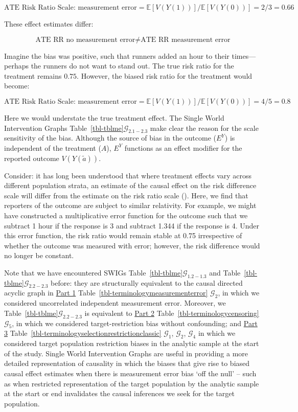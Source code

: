 \documentclass[
  single column]{article}
\begin{document}
\[
\text{ATE Risk Ratio Scale: measurement error} = \mathbb{E}[V(Y(1))] / \mathbb{E}[V(Y(0))] = 2 / 3 = 0.66
\]

These effect estimates differ:

\[\text{ATE RR no measurement error} \neq \text{ATE RR measurement error}\]

Imagine the bias was positive, such that runners added an hour to their
times---perhaps the runners do not want to stand out. The true risk
ratio for the treatment remains \(0.75\). However, the biased risk ratio
for the treatment would become:

\[
\text{ATE Risk Ratio Scale: measurement error} = \mathbb{E}[V(Y(1))] / \mathbb{E}[V(Y(0))] = 4 / 5 = 0.8
\]

Here we would understate the true treatment effect. The Single World
Intervention Graphs Table~\ref{tbl-tblme}\(\mathcal{G}_{2.1-2.3}\) make
clear the reason for the scale sensitivity of the bias. Although the
source of bias in the outcome (\(E^Y\)) is independent of the treatment
(\(A\)), \(E^Y\) functions as an effect modifier for the reported
outcome \(V(Y(\tilde{a}))\).

Consider: it has long been understood that where treatment effects vary
across different population strata, an estimate of the causal effect on
the risk difference scale will differ from the estimate on the risk
ratio scale ().
Here, we find that reporters of the outcome are subject to similar
relativity. For example, we might have constructed a multiplicative
error function for the outcome such that we subtract 1 hour if the
response is 3 and subtract 1.344 if the response is 4. Under this error
function, the risk ratio would remain stable at 0.75 irrespective of
whether the outcome was measured with error; however, the risk
difference would no longer be constant.

Note that we have encountered SWIGs
Table~\ref{tbl-tblme}\(\mathcal{G}_{1.2-1.3}\) and
Table~\ref{tbl-tblme}\(\mathcal{G}_{2.2-2.3}\) before: they are
structurally equivalent to the causal directed acyclic graph in
\hyperref[id-sec-1]{Part 1} Table~\ref{tbl-terminologymeasurementerror}
\(\mathcal{G}_2\), in which we considered uncorrelated independent
measurement error. Moreover, we
Table~\ref{tbl-tblme}\(\mathcal{G}_{2.2-2.3}\) is equivalent to
\hyperref[id-sec-2]{Part 2} Table~\ref{tbl-terminologycensoring}
\(\mathcal{G}_5\), in which we considered target-restriction bias
without confounding; and \hyperref[id-sec-3]{Part 3}
Table~\ref{tbl-terminologyselectionrestrictionclassic}
\(\mathcal{G}_1\), \(\mathcal{G}_2\), \(\mathcal{G}_4\) in which we
considered target population restriction biases in the analytic sample
at the start of the study. Single World Intervention Graphs are useful
in providing a more detailed representation of causality in which the
biases that give rise to biased causal effect estimates when there is
measurement error bias `off the null' -- such as when restricted
representation of the target population by the analytic sample at the
start or end invalidates the causal inferences we seek for the target
population.
\end{document}
